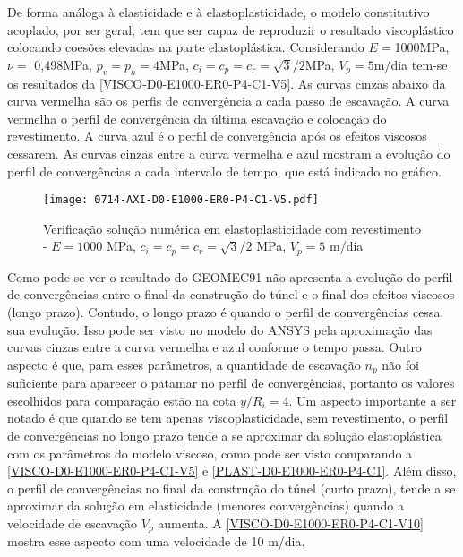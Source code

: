 De forma análoga à elasticidade e à elastoplasticidade, o modelo constitutivo acoplado, por ser geral, tem que ser capaz de reproduzir o resultado viscoplástico colocando coesões elevadas na parte elastoplástica.  Considerando $E =$1000MPa, $\nu =$ 0,498MPa, $p_v = p_h = 4$MPa, $c_i=c_p=c_r = \sqrt{3}/2$MPa, $V_p = 5$m/dia tem-se os resultados da \autoref{VISCO-D0-E1000-ER0-P4-C1-V5}. As curvas cinzas abaixo da curva vermelha são os perfis de convergência a cada passo de escavação. A curva vermelha o perfil de convergência da última escavação e colocação do revestimento. A curva azul é o perfil de convergência após os efeitos viscosos cessarem. As curvas cinzas entre a curva vermelha e azul mostram a evolução do perfil de convergências a cada intervalo de tempo, que está indicado no gráfico.
\begin{figure}[H]
	\begin{center}
		\texttt{[image: 0714-AXI-D0-E1000-ER0-P4-C1-V5.pdf]}
	\end{center}
	\caption{\label{VISCO-D0-E1000-ER0-P4-C1-V5}Verificação solução numérica em elastoplasticidade com revestimento - $E = 1000$ MPa, $c_i=c_p=c_r=\sqrt{3}/2$ MPa, $V_p=5$ m/dia}
\end{figure}
Como pode-se ver o resultado do GEOMEC91 não apresenta a evolução do perfil de convergências entre o final da construção do túnel e o final dos efeitos viscosos (longo prazo). Contudo, o longo prazo é quando o perfil de convergências cessa sua evolução. Isso pode ser visto no modelo do ANSYS pela aproximação das curvas cinzas entre a curva vermelha e azul conforme o tempo passa. Outro aspecto é que, para esses parâmetros, a quantidade de escavação $n_p$ não foi suficiente para aparecer o patamar no perfil de convergências, portanto os valores escolhidos para comparação estão na cota $y/R_i=4$. Um aspecto importante a ser notado é que quando se tem apenas viscoplasticidade, sem revestimento, o perfil de convergências no longo prazo tende a se aproximar da solução elastoplástica com os parâmetros do modelo viscoso, como pode ser visto comparando a \autoref{VISCO-D0-E1000-ER0-P4-C1-V5} e \autoref{PLAST-D0-E1000-ER0-P4-C1}. Além disso, o perfil de convergências no final da construção do túnel (curto prazo), tende a se aproximar da solução em elasticidade (menores convergências) quando a velocidade de escavação $V_p$ aumenta. A \autoref{VISCO-D0-E1000-ER0-P4-C1-V10} mostra esse aspecto com uma velocidade de 10 m/dia.

